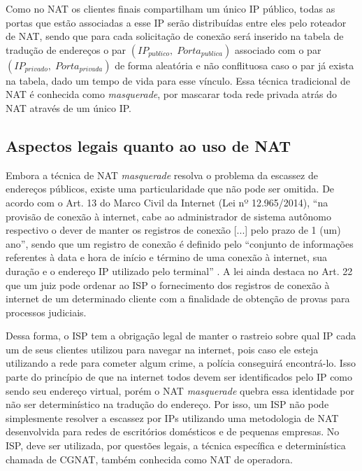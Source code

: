    Como no NAT os clientes finais compartilham um único IP público, todas as portas que estão associadas a esse IP serão distribuídas entre eles pelo roteador de NAT, sendo que para cada solicitação de conexão será inserido na tabela de tradução de endereços o par $ ( IP_{publico}, \; Porta_{publica} ) $ associado com o par $ ( IP_{privado}, \; Porta_{privada} ) $ de forma aleatória e não conflituosa caso o par já exista na tabela, dado um tempo de vida para esse vínculo. Essa técnica tradicional de NAT é conhecida como \textit{masquerade}, por mascarar toda rede privada atrás do NAT através de um único IP.
   
\subsection{Aspectos legais quanto ao uso de NAT}
\label{sec:marco_civil}

   Embora a técnica de NAT \textit{masquerade} resolva o problema da escassez de endereços públicos, existe uma particularidade que não pode ser omitida. De acordo com o Art. 13 do Marco Civil da Internet (Lei nº 12.965/2014), ``na provisão de conexão à internet, cabe ao administrador de sistema autônomo respectivo o dever de manter os registros de conexão [...] pelo prazo de 1 (um) ano'', sendo que um registro de conexão é definido pelo ``conjunto de informações referentes à data e hora de início e término de uma conexão à internet, sua duração e o endereço IP utilizado pelo terminal'' \cite{lei12965}. A lei ainda destaca no Art. 22 que um juiz pode ordenar ao ISP o fornecimento dos registros de conexão à internet de um determinado cliente com a finalidade de obtenção de provas para processos judiciais.
   
   Dessa forma, o ISP tem a obrigação legal de manter o rastreio sobre qual IP cada um de seus clientes utilizou para navegar na internet, pois caso ele esteja utilizando a rede para cometer algum crime, a polícia conseguirá encontrá-lo. Isso parte do princípio de que na internet todos devem ser identificados pelo IP como sendo seu endereço virtual, porém o NAT \textit{masquerade} quebra essa identidade por não ser determinístico na tradução do endereço. Por isso, um ISP não pode simplesmente resolver a escassez por IPs utilizando uma metodologia de NAT desenvolvida para redes de escritórios domésticos e de pequenas empresas. No ISP, deve ser utilizada, por questões legais, a técnica específica e determinística chamada de CGNAT, também conhecida como NAT de operadora.

